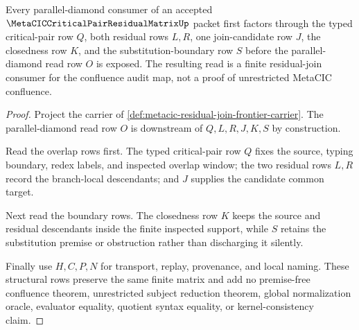 \begin{theorem}
\label{thm:metacic-residual-join-frontier-diamond-consumer}
Every parallel-diamond consumer of an accepted $\MetaCICCriticalPairResidualMatrixUp$ packet first factors through the typed critical-pair row $Q$, both residual rows $L,R$, one join-candidate row $J$, the closedness row $K$, and the substitution-boundary row $S$ before the parallel-diamond read row $O$ is exposed. The resulting read is a finite residual-join consumer for the confluence audit map, not a proof of unrestricted MetaCIC confluence.
\end{theorem}
\begin{proof}
Project the carrier of \autoref{def:metacic-residual-join-frontier-carrier}. The parallel-diamond read row $O$ is downstream of $Q,L,R,J,K,S$ by construction.

Read the overlap rows first. The typed critical-pair row $Q$ fixes the source, typing boundary, redex labels, and inspected overlap window; the two residual rows $L,R$ record the branch-local descendants; and $J$ supplies the candidate common target.

Next read the boundary rows. The closedness row $K$ keeps the source and residual descendants inside the finite inspected support, while $S$ retains the substitution premise or obstruction rather than discharging it silently.

Finally use $H,C,P,N$ for transport, replay, provenance, and local naming. These structural rows preserve the same finite matrix and add no premise-free confluence theorem, unrestricted subject reduction theorem, global normalization oracle, evaluator equality, quotient syntax equality, or kernel-consistency claim.
\end{proof}

